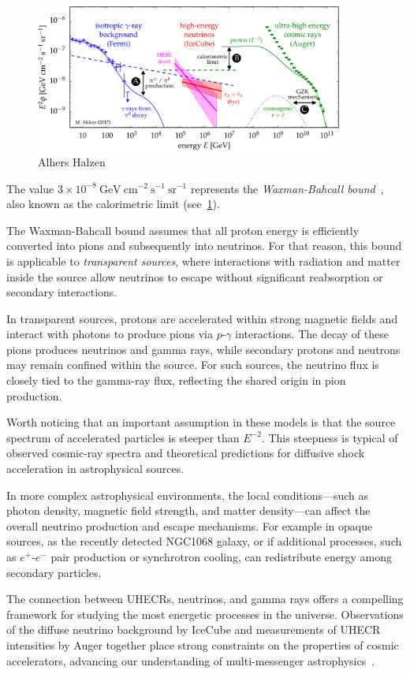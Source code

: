 \begin{figure}[!t]
\centering
\includegraphics[width=0.90\textwidth]{figures/panorama.pdf}
\caption{Alhers Halzen~\cite{Ahlers2018ppnp}}
\label{fig:uhemm}
\end{figure}

The value \(3 \times 10^{-8}~\text{GeV}~\text{cm}^{-2}~\text{s}^{-1}~\text{sr}^{-1}\) represents the \emph{Waxman-Bahcall bound}~\cite{aaa}, also known as the calorimetric limit (see~\ref{fig:uhemm}).  

The Waxman-Bahcall bound assumes that all proton energy is efficiently converted into pions and subsequently into neutrinos. For that reason, this bound is applicable to \emph{transparent sources}, where interactions with radiation and matter inside the source allow neutrinos to escape without significant reabsorption or secondary interactions.

In transparent sources, protons are accelerated within strong magnetic fields and interact with photons to produce pions via \(p\)-\(\gamma\) interactions. The decay of these pions produces neutrinos and gamma rays, while secondary protons and neutrons may remain confined within the source. 
%
For such sources, the neutrino flux is closely tied to the gamma-ray flux, reflecting the shared origin in pion production.

Worth noticing that an important assumption in these models is that the source spectrum of accelerated particles is steeper than \(E^{-2}\). This steepness is typical of observed cosmic-ray spectra and theoretical predictions for diffusive shock acceleration in astrophysical sources. 

In more complex astrophysical environments, the local conditions—such as photon density, magnetic field strength, and matter density—can affect the overall neutrino production and escape mechanisms. For example in opaque sources, as the recently detected NGC1068 galaxy, or if additional processes, such as \(e^+\)-\(e^-\) pair production or synchrotron cooling, can redistribute energy among secondary particles.

The connection between UHECRs, neutrinos, and gamma rays offers a compelling framework for studying the most energetic processes in the universe. Observations of the diffuse neutrino background by IceCube and measurements of UHECR intensities by Auger together place strong constraints on the properties of cosmic accelerators, advancing our understanding of multi-messenger astrophysics~\cite{}.
